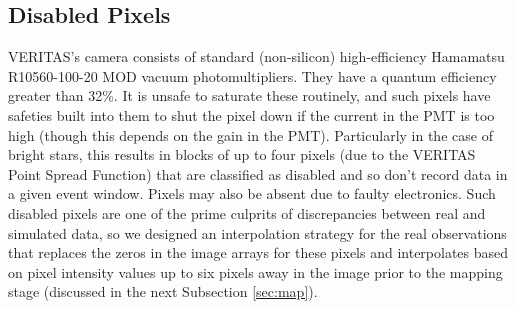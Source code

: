 \subsection{Disabled Pixels}
VERITAS's camera consists of standard (non-silicon) high-efficiency \cite{vercam} Hamamatsu R10560-100-20 MOD vacuum photomultipliers. They have a quantum efficiency greater than 32\%. It is unsafe to saturate these routinely, and such pixels have safeties built into them to shut the pixel down if the current in the PMT is too high (though this depends on the gain in the PMT). Particularly in the case of bright stars, this results in blocks of up to four pixels (due to the VERITAS Point Spread Function) that are classified as disabled and so don't record data in a given event window. Pixels may also be absent due to faulty electronics. Such disabled pixels are one of the prime culprits of discrepancies between real and simulated data, so we designed an interpolation strategy for the real observations that replaces the zeros in the image arrays for these pixels and interpolates based on pixel intensity values up to six pixels away in the image prior to the mapping stage (discussed in the next Subsection \ref{sec:map}).  


